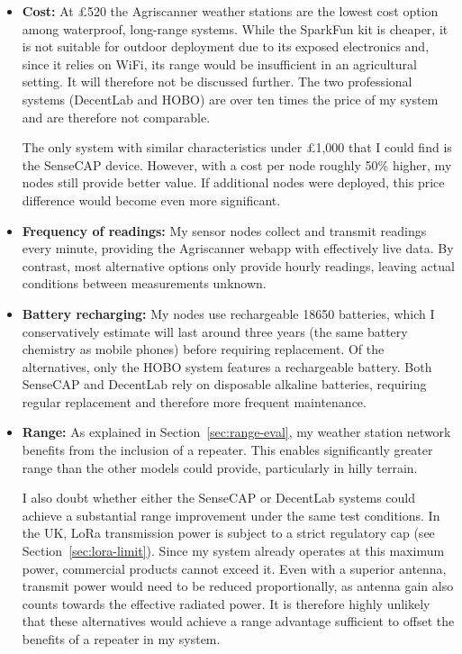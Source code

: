 \begin{itemize}
  \item \textbf{Cost:} At £520 the Agriscanner weather stations are the lowest
  cost option among waterproof, long-range systems. While the SparkFun kit is
  cheaper, it is not suitable for outdoor deployment due to its exposed
  electronics and, since it relies on WiFi, its range would be insufficient in
  an agricultural setting. It will therefore not be discussed further. The two
  professional systems (DecentLab and HOBO) are over ten times the price of my
  system and are therefore not comparable.
  
  The only system with similar characteristics under £1,000 that I could find is
  the SenseCAP device. However, with a cost per node roughly 50\% higher, my
  nodes still provide better value. If additional nodes were deployed, this
  price difference would become even more significant.

  \item \textbf{Frequency of readings:} My sensor nodes collect and transmit
  readings every minute, providing the Agriscanner webapp with effectively live
  data. By contrast, most alternative options only provide hourly readings,
  leaving actual conditions between measurements unknown.

  \item \textbf{Battery recharging:} My nodes use rechargeable 18650 batteries,
  which I conservatively estimate will last around three years (the same battery
  chemistry as mobile phones) before requiring replacement. Of the alternatives,
  only the HOBO system features a rechargeable battery. Both SenseCAP and
  DecentLab rely on disposable alkaline batteries, requiring regular replacement
  and therefore more frequent maintenance. 

  \item \textbf{Range:} As explained in Section~\ref{sec:range-eval}, my weather
  station network benefits from the inclusion of a repeater. This enables
  significantly greater range than the other models could provide, particularly
  in hilly terrain.
  
  I also doubt whether either the SenseCAP or DecentLab systems could achieve a
  substantial range improvement under the same test conditions. In the UK, LoRa
  transmission power is subject to a strict regulatory cap (see
  Section~\ref{sec:lora-limit}). Since my system already operates at this
  maximum power, commercial products cannot exceed it. Even with a superior
  antenna, transmit power would need to be reduced proportionally, as antenna
  gain also counts towards the effective radiated power. It is therefore highly
  unlikely that these alternatives would achieve a range advantage sufficient to
  offset the benefits of a repeater in my system.
\end{itemize}

